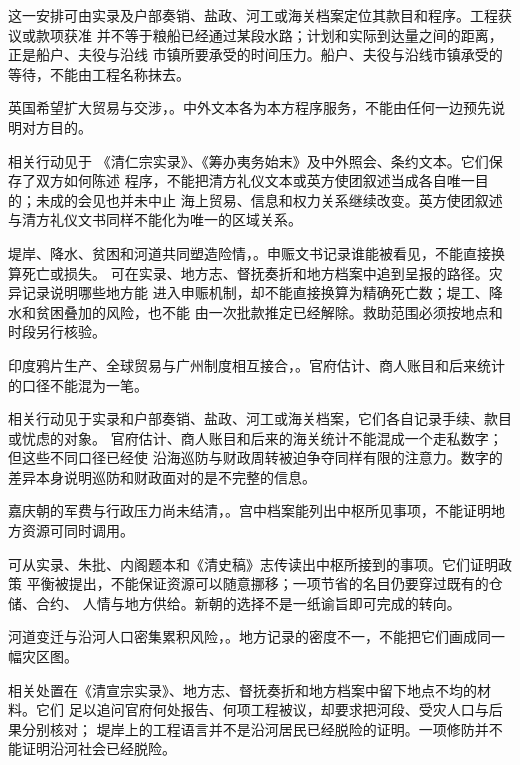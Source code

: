 这一安排可由实录及户部奏销、盐政、河工或海关档案定位其款目和程序。工程获议或款项获准
并不等于粮船已经通过某段水路；计划和实际到达量之间的距离，正是船户、夫役与沿线
市镇所要承受的时间压力。船户、夫役与沿线市镇承受的等待，不能由工程名称抹去。

英国希望扩大贸易与交涉，。中外文本各为本方程序服务，不能由任何一边预先说明对方目的。

相关行动见于
《清仁宗实录》、《筹办夷务始末》及中外照会、条约文本。它们保存了双方如何陈述
程序，不能把清方礼仪文本或英方使团叙述当成各自唯一目的；未成的会见也并未中止
海上贸易、信息和权力关系继续改变。英方使团叙述与清方礼仪文书同样不能化为唯一的区域关系。

堤岸、降水、贫困和河道共同塑造险情，。申赈文书记录谁能被看见，不能直接换算死亡或损失。
可在实录、地方志、督抚奏折和地方档案中追到呈报的路径。灾异记录说明哪些地方能
进入申赈机制，却不能直接换算为精确死亡数；堤工、降水和贫困叠加的风险，也不能
由一次批款推定已经解除。救助范围必须按地点和时段另行核验。

印度鸦片生产、全球贸易与广州制度相互接合，。官府估计、商人账目和后来统计的口径不能混为一笔。


相关行动见于实录和户部奏销、盐政、河工或海关档案，它们各自记录手续、款目或忧虑的对象。
官府估计、商人账目和后来的海关统计不能混成一个走私数字；但这些不同口径已经使
沿海巡防与财政周转被迫争夺同样有限的注意力。数字的差异本身说明巡防和财政面对的是不完整的信息。

嘉庆朝的军费与行政压力尚未结清，。宫中档案能列出中枢所见事项，不能证明地方资源可同时调用。


可从实录、朱批、内阁题本和《清史稿》志传读出中枢所接到的事项。它们证明政策
平衡被提出，不能保证资源可以随意挪移；一项节省的名目仍要穿过既有的仓储、合约、
人情与地方供给。新朝的选择不是一纸谕旨即可完成的转向。

河道变迁与沿河人口密集累积风险，。地方记录的密度不一，不能把它们画成同一幅灾区图。

相关处置在《清宣宗实录》、地方志、督抚奏折和地方档案中留下地点不均的材料。它们
足以追问官府何处报告、何项工程被议，却要求把河段、受灾人口与后果分别核对；
堤岸上的工程语言并不是沿河居民已经脱险的证明。一项修防并不能证明沿河社会已经脱险。

